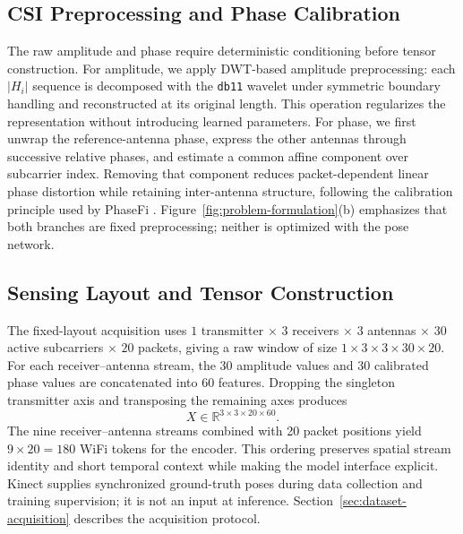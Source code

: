 \documentclass[conference,onecolumn]{IEEEtran}
\begin{document}
\subsection{CSI Preprocessing and Phase Calibration}
The raw amplitude and phase require deterministic conditioning before tensor construction. For amplitude, we apply DWT-based amplitude preprocessing: each $|H_i|$ sequence is decomposed with the \texttt{db11} wavelet under symmetric boundary handling and reconstructed at its original length. This operation regularizes the representation without introducing learned parameters. For phase, we first unwrap the reference-antenna phase, express the other antennas through successive relative phases, and estimate a common affine component over subcarrier index. Removing that component reduces packet-dependent linear phase distortion while retaining inter-antenna structure, following the calibration principle used by PhaseFi \cite{wang2015phasefi}. Figure~\ref{fig:problem-formulation}(b) emphasizes that both branches are fixed preprocessing; neither is optimized with the pose network.

\subsection{Sensing Layout and Tensor Construction}
The fixed-layout acquisition uses $1$ transmitter $\times$ $3$ receivers $\times$ $3$ antennas $\times$ $30$ active subcarriers $\times$ $20$ packets, giving a raw window of size $1\times3\times3\times30\times20$. For each receiver--antenna stream, the 30 amplitude values and 30 calibrated phase values are concatenated into 60 features. Dropping the singleton transmitter axis and transposing the remaining axes produces
\begin{equation}
    X\in\mathbb R^{3\times3\times20\times60}.
    \label{eq:csi-tensor}
\end{equation}
The nine receiver--antenna streams combined with 20 packet positions yield $9\times20=180$ WiFi tokens for the encoder. This ordering preserves spatial stream identity and short temporal context while making the model interface explicit. Kinect supplies synchronized ground-truth poses during data collection and training supervision; it is not an input at inference. Section~\ref{sec:dataset-acquisition} describes the acquisition protocol.
\end{document}
